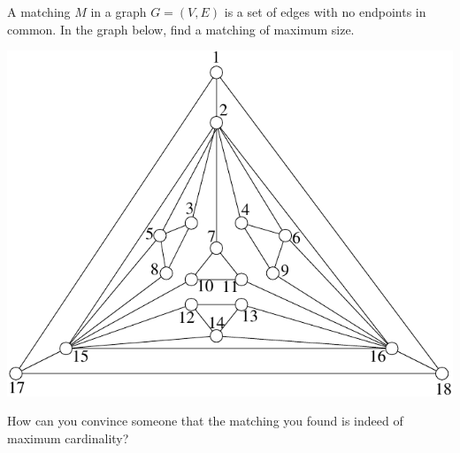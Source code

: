 \documentclass[12pt]{article}
\begin{document}

A matching $M$ in a graph $G=(V,E)$ is a set of edges with no
endpoints in common. In the graph below, find a matching of maximum
size. 

\begin{center}
\includegraphics{../figures/matching}
\end{center}

How can you convince someone that the matching you found is indeed of
maximum cardinality?
\end{document}
